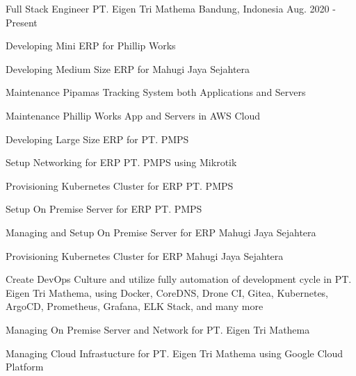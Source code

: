 

\begin{cventries}

  \cventry
    {Full Stack Engineer} %
    {PT. Eigen Tri Mathema} %
    {Bandung, Indonesia} %
    {Aug. 2020 - Present} %
    {
      \begin{cvitems} %
        \item {Developing Mini ERP for Phillip Works}
        \item {Developing Medium Size ERP for Mahugi Jaya Sejahtera}
        \item {Maintenance Pipamas Tracking System both Applications and Servers}
        \item {Maintenance Phillip Works App and Servers in AWS Cloud}
        \item {Developing Large Size ERP for PT. PMPS}
        \item {Setup Networking for ERP PT. PMPS using Mikrotik}
        \item {Provisioning Kubernetes Cluster for ERP PT. PMPS}
        \item {Setup On Premise Server for ERP PT. PMPS}
        \item {Managing and Setup On Premise Server for ERP Mahugi Jaya Sejahtera}
        \item {Provisioning Kubernetes Cluster for ERP Mahugi Jaya Sejahtera}
        \item {Create DevOps Culture and utilize fully automation of development cycle in PT. Eigen Tri Mathema, using Docker, CoreDNS, Drone CI, Gitea, Kubernetes, ArgoCD, Prometheus, Grafana, ELK Stack, and many more}
        \item {Managing On Premise Server and Network for PT. Eigen Tri Mathema}
        \item {Managing Cloud Infrastucture for PT. Eigen Tri Mathema using Google Cloud Platform}
      \end{cvitems}
    }


\end{cventries}
